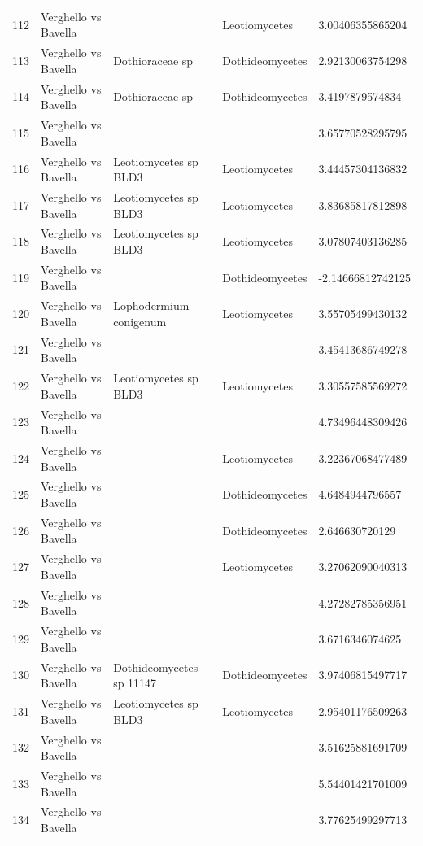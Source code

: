 \documentclass[12pt]{article}\usepackage[]{graphicx}\usepackage[]{color}
\numberwithin{figure}{section}
\begin{document}
\begin{table}[ht]
\begin{tabular}{lllll}
  112 & Verghello vs Bavella &  & Leotiomycetes & 3.00406355865204 \\ 
  113 & Verghello vs Bavella & Dothioraceae sp & Dothideomycetes & 2.92130063754298 \\ 
  114 & Verghello vs Bavella & Dothioraceae sp & Dothideomycetes & 3.4197879574834 \\ 
  115 & Verghello vs Bavella &  &  & 3.65770528295795 \\ 
  116 & Verghello vs Bavella & Leotiomycetes sp BLD3 & Leotiomycetes & 3.44457304136832 \\ 
  117 & Verghello vs Bavella & Leotiomycetes sp BLD3 & Leotiomycetes & 3.83685817812898 \\ 
  118 & Verghello vs Bavella & Leotiomycetes sp BLD3 & Leotiomycetes & 3.07807403136285 \\ 
  119 & Verghello vs Bavella &  & Dothideomycetes & -2.14666812742125 \\ 
  120 & Verghello vs Bavella & Lophodermium conigenum & Leotiomycetes & 3.55705499430132 \\ 
  121 & Verghello vs Bavella &  &  & 3.45413686749278 \\ 
  122 & Verghello vs Bavella & Leotiomycetes sp BLD3 & Leotiomycetes & 3.30557585569272 \\ 
  123 & Verghello vs Bavella &  &  & 4.73496448309426 \\ 
  124 & Verghello vs Bavella &  & Leotiomycetes & 3.22367068477489 \\ 
  125 & Verghello vs Bavella &  & Dothideomycetes & 4.6484944796557 \\ 
  126 & Verghello vs Bavella &  & Dothideomycetes & 2.646630720129 \\ 
  127 & Verghello vs Bavella &  & Leotiomycetes & 3.27062090040313 \\ 
  128 & Verghello vs Bavella &  &  & 4.27282785356951 \\ 
  129 & Verghello vs Bavella &  &  & 3.6716346074625 \\ 
  130 & Verghello vs Bavella & Dothideomycetes sp 11147 & Dothideomycetes & 3.97406815497717 \\ 
  131 & Verghello vs Bavella & Leotiomycetes sp BLD3 & Leotiomycetes & 2.95401176509263 \\ 
  132 & Verghello vs Bavella &  &  & 3.51625881691709 \\ 
  133 & Verghello vs Bavella &  &  & 5.54401421701009 \\ 
  134 & Verghello vs Bavella &  &  & 3.77625499297713 \\ 

\end{tabular}
\end{table}
\end{document}
